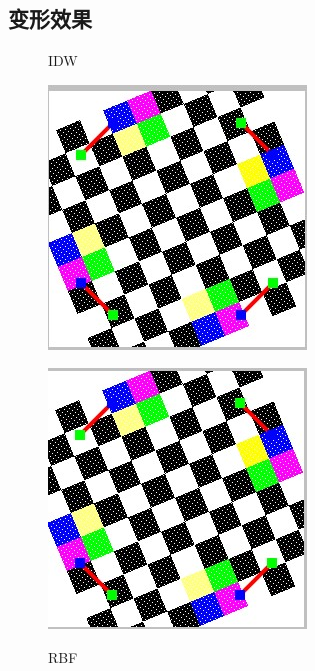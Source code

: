 \documentclass{article}
\begin{document}
	\subsection{变形效果}
	\begin{figure}[htbp]
		\centering
		\begin{minipage}{0.4\linewidth}
			\centering
			\caption{IDW}
			\includegraphics[width=1\linewidth]{IDW1.jpg}
			\label{chutian1}
		\end{minipage}
		\begin{minipage}{0.4\linewidth}
			\centering
			\caption{RBF}
			\includegraphics[width=1\linewidth]{RBF1.jpg}
			\label{chutian2}
		\end{minipage}
	\end{figure}
\end{document}
